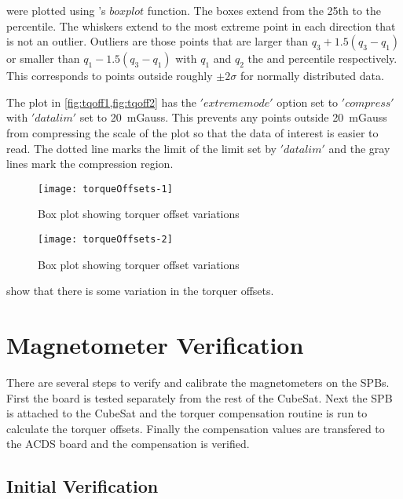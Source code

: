  were plotted using \matlab's \lstMat$boxplot$ function. The boxes extend from the 25th to the  percentile. The whiskers extend to the most extreme point in each direction that is not an outlier. Outliers are those points that are larger than $q_3 + 1.5 \left( q_3 - q_1 \right)$ or smaller than $q_1 - 1.5 \left( q_3 - q_1 \right)$ with $q_1$ and $q_2$ the  and  percentile respectively. This corresponds to points outside roughly $\pm 2 \sigma$ for normally distributed data. \cite{MatBox}

The plot in \cref{fig:tqoff1,fig:tqoff2} has the \lstMat$'extrememode'$ option set to \lstMat$'compress'$ with \lstMat$'datalim'$ set to \textpm{}20~mGauss. This prevents any points outside \textpm{}20~mGauss from compressing the scale of the plot so that the data of interest is easier to read. The dotted line marks the limit of the limit set by \lstMat$'datalim'$ and the gray lines mark the compression region. \cite{MatBox}

\begin{figure}[!htb]
    \centering
    \texttt{[image: torqueOffsets-1]}
    \caption{Box plot showing torquer offset variations}
    \label{fig:tqoff1}
\end{figure}

\begin{figure}[!htb]
    \centering
    \texttt{[image: torqueOffsets-2]}
    \caption{Box plot showing torquer offset variations}
    \label{fig:tqoff2}
\end{figure}

 show that there is some variation in the torquer offsets. 

\section{Magnetometer Verification}

There are several steps to verify and calibrate the magnetometers on the \acp{SPB}. First the board is tested separately from the rest of the CubeSat. Next the \ac{SPB} is attached to the CubeSat and the torquer compensation routine is run to calculate the torquer offsets. Finally the compensation values are transfered to the \ac{ACDS} board and the compensation is verified.


\subsection{Initial Verification}

